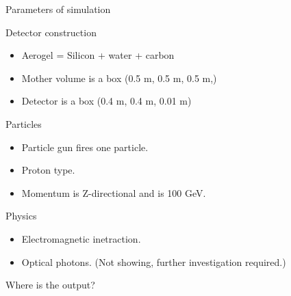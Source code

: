 \documentclass[11pt]{beamer}
\begin{document}
\begin{frame}{Parameters of simulation}
    \begin{block}{Detector construction}
    \begin{itemize}
        \item Aerogel = Silicon + water + carbon
        \item Mother volume is a box (0.5 m, 0.5 m, 0.5 m,)
        \item Detector is a box (0.4 m, 0.4 m, 0.01 m)
    \end{itemize}
    \end{block}
    
    \begin{block}{Particles}
    \begin{itemize}
        \item Particle gun fires one particle.
        \item Proton type.
        \item Momentum is Z-directional and is 100 GeV.
    \end{itemize}
    \end{block}
    
    \begin{block}{Physics}
    \begin{itemize}
        \item Electromagnetic inetraction.
        \item Optical photons. (Not showing, further investigation required.)
    \end{itemize}
    \end{block}
    
    Where is the output?
    
\end{frame}
\end{document}
